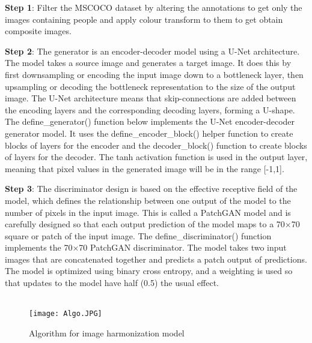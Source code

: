 \documentclass{article}
\begin{document}
\begin{center}
\end{center}

\textbf{Step 1}: Filter the MSCOCO dataset by altering the annotations to get only the images containing people and apply colour transform to them to get obtain composite images.

\begin{center}
\end{center}

\textbf{Step 2}: The generator is an encoder-decoder model using a U-Net architecture. The model takes a source image and generates a target image. It does this by first downsampling or encoding the input image down to a bottleneck layer, then upsampling or decoding the bottleneck representation to the size of the output image. The U-Net architecture means that skip-connections are added between the encoding layers and the corresponding decoding layers, forming a U-shape.\\
The define\_generator() function below implements the U-Net encoder-decoder generator model. It uses the define\_encoder\_block() helper function to create blocks of layers for the encoder and the decoder\_block() function to create blocks of layers for the decoder. The tanh activation function is used in the output layer, meaning that pixel values in the generated image will be in the range [-1,1].

\begin{center}
\end{center}

\textbf{Step 3}: The discriminator design is based on the effective receptive field of the model, which defines the relationship between one output of the model to the number of pixels in the input image. This is called a PatchGAN model and is carefully designed so that each output prediction of the model maps to a 70×70 square or patch of the input image. The define\_discriminator() function implements the 70×70 PatchGAN discriminator. The model takes two input images that are concatenated together and predicts a patch output of predictions. The model is optimized using binary cross entropy, and a weighting is used so that updates to the model have half (0.5) the usual effect.\\\\



\begin{figure}[htp]
    \centering
    \Large\texttt{[image: Algo.JPG]}
    \caption{Algorithm for image harmonization model}
    \label{fig:Algo}
\end{figure}
\end{document}
